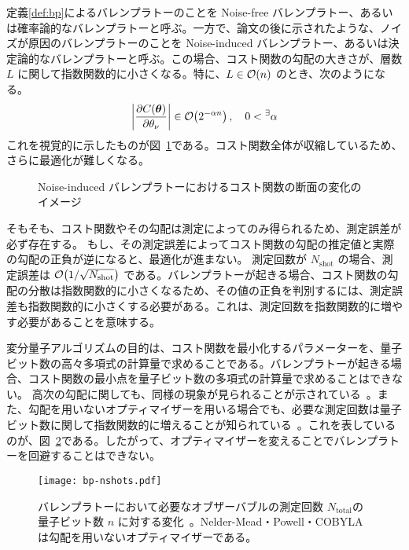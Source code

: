 定義\ref{def:bp}によるバレンプラトーのことを Noise-free バレンプラトー、あるいは確率論的なバレンプラトーと呼ぶ。一方で、論文\cite{mcclean2018barren}の後に示されたような、ノイズが原因のバレンプラトーのことを Noise-induced バレンプラトー、あるいは決定論的なバレンプラトーと呼ぶ。この場合、コスト関数の勾配の大きさが、層数 $L$ に関して指数関数的に小さくなる\cite{wang2021noiseinduced}。特に、$L \in \order{n}$ のとき、次のようになる。
\begin{align}
    \abs{\pdv{C(\bs{\th})}{\th_\nu}} \in \order{2^{-\alpha n}}\,, \quad 0 < \ex \alpha
\end{align}
これを視覚的に示したものが図~\ref{fig:bp-cost-2}である。コスト関数全体が収縮しているため、さらに最適化が難しくなる。

\begin{figure}[H]
    \centering
    \caption{Noise-induced バレンプラトーにおけるコスト関数の断面の変化のイメージ}
    \label{fig:bp-cost-2}
\end{figure}


そもそも、コスト関数やその勾配は測定によってのみ得られるため、測定誤差が必ず存在する。
もし、その測定誤差によってコスト関数の勾配の推定値と実際の勾配の正負が逆になると、最適化が進まない。
測定回数が $N_{\text{shot}}$ の場合、測定誤差は $\order{1/\sqrt{N_{\text{shot}}}}$ である。バレンプラトーが起きる場合、コスト関数の勾配の分散は指数関数的に小さくなるため、その値の正負を判別するには、測定誤差も指数関数的に小さくする必要がある。これは、測定回数を指数関数的に増やす必要があることを意味する。

変分量子アルゴリズムの目的は、コスト関数を最小化するパラメーターを、量子ビット数の高々多項式の計算量で求めることである。バレンプラトーが起きる場合、コスト関数の最小点を量子ビット数の多項式の計算量で求めることはできない。
高次の勾配に関しても、同様の現象が見られることが示されている~\cite{cerezo2021higher}。また、勾配を用いないオプティマイザーを用いる場合でも、必要な測定回数は量子ビット数に関して指数関数的に増えることが知られている~\cite{arrasmith2021effect}。これを表しているのが、図~\ref{fig:bp-var}である。したがって、オプティマイザーを変えることでバレンプラトーを回避することはできない。
\begin{figure}[H]
    \centering
    \texttt{[image: bp-nshots.pdf]}
    \caption{バレンプラトーにおいて必要なオブザーバブルの測定回数 $N_{\text{total}}$の量子ビット数 $n$ に対する変化~\cite{arrasmith2021effect}。Nelder-Mead・Powell・COBYLA は勾配を用いないオプティマイザーである。}
    \label{fig:bp-var}
\end{figure}


